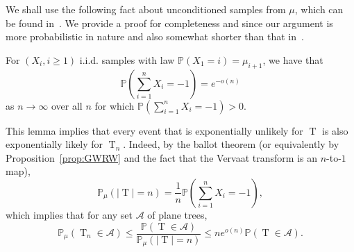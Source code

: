 \documentclass[AHL,Unicode,longabstracts,published]{cedram}
\renewcommand{\P}{\mathbb{P}}
\DeclareMathOperator{\rtree}{T}
\newcommand\cA{\mathcal{A}}
\begin{document}
We shall use the following fact about unconditioned samples from $\mu$, which can be found in~\cite[Lemmas~14.3 and~14.4]{Jan12}. We provide a proof for completeness and since our argument is {more probabilistic in nature and also} somewhat shorter than that in~\cite{Jan12}.
\begin{lemm}\label{lem:probtree}
For $(X_i,i \ge 1)$ i.i.d. samples with law $\P(X_1=i)=\mu_{i+1}$, we have that
\[
\P\left(\sum_{i=1}^n X_i=-1\right)=e^{-o(n)}
\]
as $n\to \infty$ over all $n$ for which $\P\left(\sum_{i=1}^n X_i=-1\right)>0$.
\end{lemm} This lemma implies that every event that is exponentially unlikely for $\rtree$ is also exponentially likely for $\rtree_n$. Indeed, by the ballot theorem (or equivalently by Proposition~\ref{prop:GWRW} and the fact that the Vervaat transform is an $n$-to-$1$ map),
\[
\P_\mu(|\rtree|=n)=\frac{1}{n}\P\left(\sum_{i=1}^n X_i=-1\right),
\]
which implies that for any set $\cA$ of plane trees,
\[
\P_\mu(\rtree_{n} \in \cA)\leq \frac{\P(\rtree \in \cA)}{\P_\mu(|\rtree|=n)}\leq ne^{o(n)} \P(\rtree \in \cA).
\]
\end{document}
